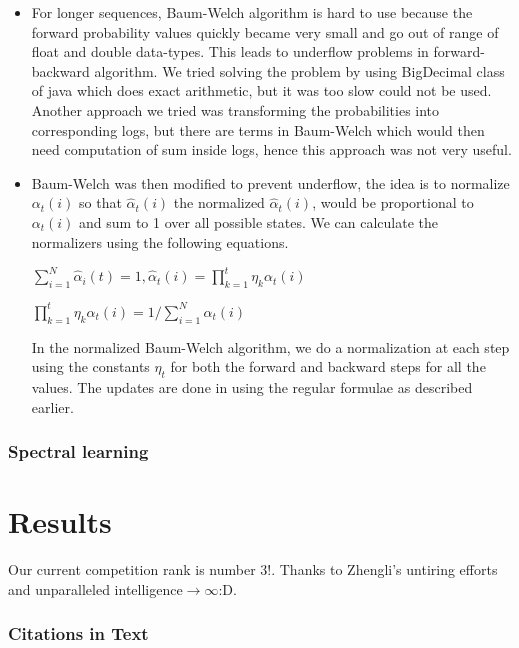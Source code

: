 \documentclass[letterpaper]{article}
\begin{document}
\begin{itemize}
\item For longer sequences, Baum-Welch algorithm is hard to use because the forward probability values quickly became very small and go out of range of float and double data-types. This leads to underflow problems in forward-backward algorithm. We tried solving the problem by using BigDecimal class of java which does exact arithmetic, but it was too slow could not be used. Another approach we tried was transforming the probabilities into corresponding logs, but there are terms in Baum-Welch which would then need computation of sum inside logs, hence this approach was not very useful.   

\item Baum-Welch was then modified  to prevent underflow, the idea is to normalize $\alpha_t(i)$ so that $\hat{\alpha}_{t}(i)$ the normalized $\hat{\alpha}_{t}(i)$, would be proportional to $\alpha_{t}(i)$ and sum to 1 over all possible states. We can calculate the normalizers using the following equations. 

\begin{center}

$\sum_{i=1}^{N}\hat{\alpha}_{i}(t) = 1 , \hat{\alpha}_{t}(i) = \prod_{k=1}^t\eta_{k}\alpha_{t}(i)$ 

$\prod_{k=1}^t\eta_{k}\alpha_{t}(i) = 1/\sum_{i=1}^N\alpha_{t}(i)$

\end{center}

In the normalized Baum-Welch algorithm, we do a normalization at each step using the constants $\eta_{t}$ for both the forward and backward steps for all the values. The updates are done in using the regular formulae as described earlier.
 
\end{itemize}

\subsubsection{Spectral learning}



\section{Results}

Our current competition rank is number 3!. Thanks to Zhengli's untiring efforts and unparalleled intelligence$\longrightarrow\infty$:D. 




\subsubsection{Citations in Text}
\end{document}
